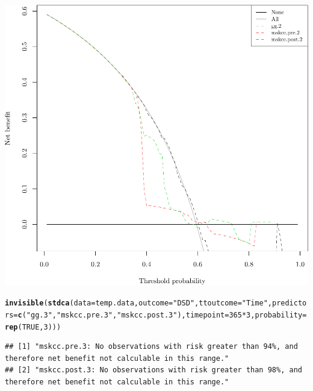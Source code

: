 \documentclass{article}\usepackage[]{graphicx}\usepackage[]{color}
\makeatletter
\def\maxwidth{ %
  \ifdim\Gin@nat@width>\linewidth
    \linewidth
  \else
    \Gin@nat@width
  \fi
}
\newcommand{\hlnum}[1]{\textcolor[rgb]{0.686,0.059,0.569}{#1}}%
\newcommand{\hlstr}[1]{\textcolor[rgb]{0.192,0.494,0.8}{#1}}%
\newcommand{\hlopt}[1]{\textcolor[rgb]{0,0,0}{#1}}%
\newcommand{\hlstd}[1]{\textcolor[rgb]{0.345,0.345,0.345}{#1}}%
\newcommand{\hlkwc}[1]{\textcolor[rgb]{0.333,0.667,0.333}{#1}}%
\newcommand{\hlkwd}[1]{\textcolor[rgb]{0.737,0.353,0.396}{\textbf{#1}}}%
\newenvironment{kframe}{%
 \def\at@end@of@kframe{}%
 \ifinner\ifhmode%
  \def\at@end@of@kframe{\end{minipage}}%
  \begin{minipage}{\columnwidth}%
 \fi\fi%
 \def\FrameCommand##1{\hskip\@totalleftmargin \hskip-\fboxsep
 \colorbox{shadecolor}{##1}\hskip-\fboxsep
     \hskip-\linewidth \hskip-\@totalleftmargin \hskip\columnwidth}%
 \MakeFramed {\advance\hsize-\width
   \@totalleftmargin\z@ \linewidth\hsize
   \@setminipage}}%
 {\par\unskip\endMakeFramed%
 \at@end@of@kframe}
\newenvironment{knitrout}{}{} %
\makeatother
\begin{document}
\begin{knitrout}
{\centering \includegraphics[width=\maxwidth]{figure/07-model-selection-dca-8} 

}


\begin{kframe}\begin{alltt}
\hlkwd{invisible}\hlstd{(}\hlkwd{stdca}\hlstd{(}\hlkwc{data} \hlstd{= temp.data,} \hlkwc{outcome} \hlstd{=} \hlstr{"DSD"}\hlstd{,} \hlkwc{ttoutcome} \hlstd{=} \hlstr{"Time"}\hlstd{,} \hlkwc{predictors} \hlstd{=} \hlkwd{c}\hlstd{(}\hlstr{"gg.3"}\hlstd{,} \hlstr{"mskcc.pre.3"}\hlstd{,} \hlstr{"mskcc.post.3"}\hlstd{),} \hlkwc{timepoint} \hlstd{=} \hlnum{365}\hlopt{*}\hlnum{3}\hlstd{,} \hlkwc{probability} \hlstd{=} \hlkwd{rep}\hlstd{(}\hlnum{TRUE}\hlstd{,} \hlnum{3}\hlstd{)))}
\end{alltt}
\begin{verbatim}
## [1] "mskcc.pre.3: No observations with risk greater than 94%, and therefore net benefit not calculable in this range." 
## [2] "mskcc.post.3: No observations with risk greater than 98%, and therefore net benefit not calculable in this range."
\end{verbatim}
\end{kframe}


\end{knitrout}
\end{document}
